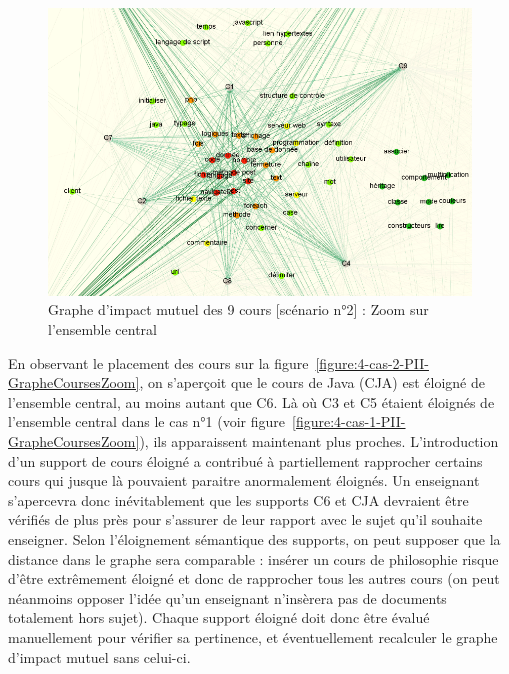 \hspace{0pt}
\vfill



\clearpage


\begin{figure}[htb!]
\centering
\centerline{  %
\includegraphics[scale=0.65]{4-Experiences/images/cas-2/graphe-Directe-core-zoom.png}
}
\caption{Graphe d'impact mutuel des 9 cours [scénario n°2] : Zoom sur l'ensemble central}
\label{figure:4-cas-2-PII-GrapheCoreZoom}
\end{figure}

\bigskip

En observant le placement des cours sur la figure~\ref{figure:4-cas-2-PII-GrapheCoursesZoom}, on s'aperçoit que le cours de Java (CJA) est éloigné de l'ensemble central, au moins autant que C6.
Là où C3 et C5 étaient éloignés de l'ensemble central dans le cas n°1 (voir figure~\ref{figure:4-cas-1-PII-GrapheCoursesZoom}), ils apparaissent maintenant plus proches.
L'introduction d'un support de cours éloigné a contribué à partiellement rapprocher certains cours qui jusque là pouvaient paraitre anormalement éloignés.
Un enseignant s'apercevra donc inévitablement que les supports C6 et CJA devraient être vérifiés de plus près pour s'assurer de leur rapport avec le sujet qu'il souhaite enseigner.
Selon l'éloignement sémantique des supports, on peut supposer que la distance dans le graphe sera comparable : insérer un cours de philosophie risque d'être extrêmement éloigné et donc de rapprocher tous les autres cours (on peut néanmoins opposer l'idée qu'un enseignant n'insèrera pas de documents totalement hors sujet).
Chaque support éloigné doit donc être évalué manuellement pour vérifier sa pertinence, et éventuellement recalculer le graphe d'impact mutuel sans celui-ci.


